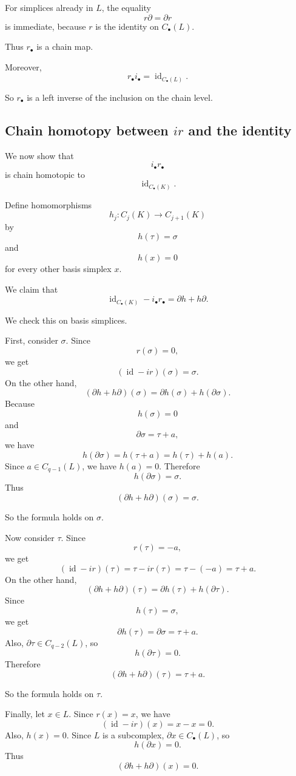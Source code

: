 \documentclass[12pt,a4paper]{article}
\theoremstyle{notespace}
\begin{document}
For simplices already in \(L\), the equality
\[
r\partial=\partial r
\]
is immediate, because \(r\) is the identity on \(C_\bullet(L)\).

Thus \(r_\bullet\) is a chain map.

Moreover,
\[
r_\bullet i_\bullet=\operatorname{id}_{C_\bullet(L)}.
\]

So \(r_\bullet\) is a left inverse of the inclusion on the chain level.

\subsection{Chain homotopy between \(i r\) and the identity}

We now show that
\[
i_\bullet r_\bullet
\]
is chain homotopic to
\[
\operatorname{id}_{C_\bullet(K)}.
\]

Define homomorphisms
\[
h_j\colon C_j(K)\to C_{j+1}(K)
\]
by
\[
h(\tau)=\sigma
\]
and
\[
h(x)=0
\]
for every other basis simplex \(x\).

We claim that
\[
\operatorname{id}_{C_\bullet(K)}-i_\bullet r_\bullet
=
\partial h+h\partial.
\]

We check this on basis simplices.

First, consider \(\sigma\). Since
\[
r(\sigma)=0,
\]
we get
\[
(\operatorname{id}-ir)(\sigma)=\sigma.
\]
On the other hand,
\[
(\partial h+h\partial)(\sigma)
=
\partial h(\sigma)+h(\partial\sigma).
\]
Because
\[
h(\sigma)=0
\]
and
\[
\partial\sigma=\tau+a,
\]
we have
\[
h(\partial\sigma)
=
h(\tau+a)
=
h(\tau)+h(a).
\]
Since \(a\in C_{q-1}(L)\), we have \(h(a)=0\). Therefore
\[
h(\partial\sigma)=\sigma.
\]
Thus
\[
(\partial h+h\partial)(\sigma)=\sigma.
\]

So the formula holds on \(\sigma\).

Now consider \(\tau\). Since
\[
r(\tau)=-a,
\]
we get
\[
(\operatorname{id}-ir)(\tau)
=
\tau-ir(\tau)
=
\tau-(-a)
=
\tau+a.
\]
On the other hand,
\[
(\partial h+h\partial)(\tau)
=
\partial h(\tau)+h(\partial\tau).
\]
Since
\[
h(\tau)=\sigma,
\]
we get
\[
\partial h(\tau)=\partial\sigma=\tau+a.
\]
Also, \(\partial\tau\in C_{q-2}(L)\), so
\[
h(\partial\tau)=0.
\]
Therefore
\[
(\partial h+h\partial)(\tau)=\tau+a.
\]

So the formula holds on \(\tau\).

Finally, let \(x\in L\). Since \(r(x)=x\), we have
\[
(\operatorname{id}-ir)(x)=x-x=0.
\]
Also, \(h(x)=0\). Since \(L\) is a subcomplex, \(\partial x\in C_\bullet(L)\), so
\[
h(\partial x)=0.
\]
Thus
\[
(\partial h+h\partial)(x)=0.
\]
\end{document}
